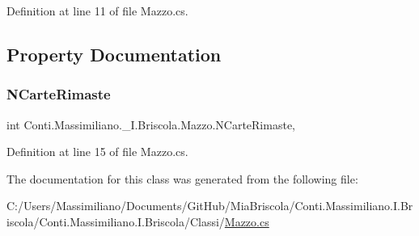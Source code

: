 Definition at line 11 of file Mazzo.\+cs.



\subsection{Property Documentation}
\hypertarget{class_conti_1_1_massimiliano_1_1__5_i_1_1_briscola_1_1_mazzo_a2cf98bbfe46e4629a31e1a426c78eaf7}{}\label{class_conti_1_1_massimiliano_1_1__5_i_1_1_briscola_1_1_mazzo_a2cf98bbfe46e4629a31e1a426c78eaf7} 
\subsubsection{\texorpdfstring{N\+Carte\+Rimaste}{NCarteRimaste}}
{\footnotesize\ttfamily int Conti.\+Massimiliano.\+\_\+I.\+Briscola.\+Mazzo.\+N\+Carte\+Rimaste\hspace{0.3cm}{\ttfamily [get]}, {\ttfamily [set]}}



Definition at line 15 of file Mazzo.\+cs.



The documentation for this class was generated from the following file\+:\begin{DoxyCompactItemize}
\item 
C\+:/\+Users/\+Massimiliano/\+Documents/\+Git\+Hub/\+Mia\+Briscola/\+Conti.\+Massimiliano.\+I.\+Briscola/\+Conti.\+Massimiliano.\+I.\+Briscola/\+Classi/\hyperlink{_mazzo_8cs}{Mazzo.\+cs}\end{DoxyCompactItemize}
